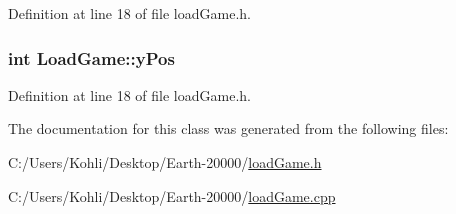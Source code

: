 Definition at line 18 of file loadGame.h.\hypertarget{class_load_game_a074a34ee4e6924d306030caaaefadc74}{
\subsubsection[{yPos}]{\setlength{\rightskip}{0pt plus 5cm}int {\bf LoadGame::yPos}}}
\label{class_load_game_a074a34ee4e6924d306030caaaefadc74}


Definition at line 18 of file loadGame.h.

The documentation for this class was generated from the following files:\begin{DoxyCompactItemize}
\item 
C:/Users/Kohli/Desktop/Earth-\/20000/\hyperlink{load_game_8h}{loadGame.h}\item 
C:/Users/Kohli/Desktop/Earth-\/20000/\hyperlink{load_game_8cpp}{loadGame.cpp}\end{DoxyCompactItemize}
